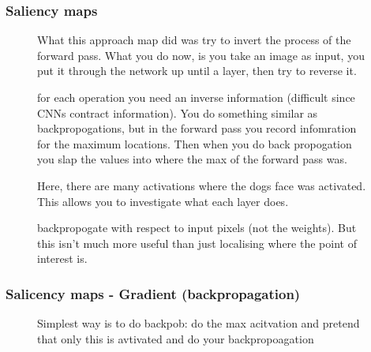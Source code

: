 \documentclass[11pt]{article}
\begin{document}
\subsubsection{Saliency maps}

\begin{figure}[H]
    \centering
    \caption{What this approach map did was try to invert the process of the forward pass. What you do now, is you take an image as input, you put it through the network up until a layer, then try to reverse it.}
\end{figure}

\begin{figure}[H]
    \centering
    \caption{for each operation you need an inverse information (difficult since CNNs contract information). You do something similar as backpropogations, but in the forward pass you record infomration for the maximum locations. Then when you do back propogation you slap the values into where the max of the forward pass was.}
\end{figure}

\begin{figure}[H]
    \centering
    \caption{Here, there are many activations where the dogs face was activated. This allows you to investigate what each layer does.}
\end{figure}

\begin{figure}[H]
    \centering
    \caption{backpropogate with respect to input pixels (not the weights). But this isn't much more useful than just localising where the point of interest is.}
\end{figure}

\subsubsection{Salicency maps - Gradient (backpropagation)}

\begin{figure}[H]
    \centering
    \caption{Simplest way is to do backpob: do the max acitvation and pretend that only this is avtivated and do your backpropoagation}
\end{figure}
\end{document}
